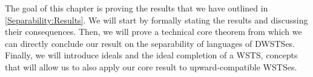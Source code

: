 \documentclass[../../diss.tex]{subfiles}
\begin{document}
The goal of this chapter is proving the results that we have outlined in \cref{Separability:Results}.
We will start by formally stating the results and discussing their consequences.
Then, we will prove a technical core theorem from which we can directly conclude our result on the separability of languages of DWSTSes.
Finally, we will introduce ideals and the ideal completion of a WSTS, concepts that will allow us to also apply our core result to upward-compatible WSTSes.
\end{document}
